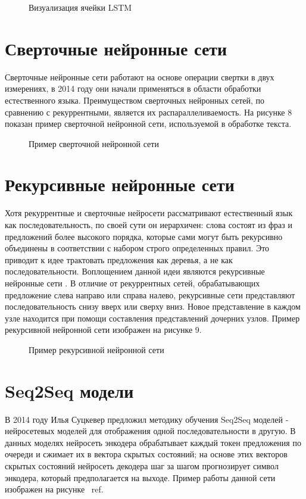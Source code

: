 \begin{figure}[ht]
  \caption{Визуализация ячейки LSTM}\label{fig:Neuro3-LSTM}
\end{figure}


\section{Сверточные нейронные сети}
Сверточные нейронные сети работают на основе операции свертки в двух измерениях, в 2014 году \cite{kalchbrenner_2014} они начали применяться в области обработки естественного языка. Преимуществом сверточных нейронных сетей, по сравнению с рекуррентными, является их распараллеливаемость. На рисунке 8 показан пример сверточной нейронной сети, используемой в обработке текста.


\begin{figure}[ht]
  \caption{Пример сверточной нейронной сети}\label{fig:Neuro4-CNN}
\end{figure}

\section{Рекурсивные нейронные сети}
Хотя рекуррентные и сверточные нейросети рассматривают естественный язык как последовательность, по своей сути он иерархичен: слова состоят из фраз и предложений более высокого порядка, которые сами могут быть рекурсивно объединены в соответствии с набором строго определенных правил. Это приводит к идее трактовать предложения как деревья, а не как последовательности. Воплощением данной идеи являются рекурсивные нейронные сети \cite{socher_2013}. В отличие от рекуррентных сетей, обрабатывающих предложение слева направо или справа налево, рекурсивные сети представляют последовательность снизу вверх или сверху вниз. Новое представление в каждом узле находится при помощи составления представлений дочерних узлов. Пример рекурсивной нейронной сети изображен на рисунке 9.



\begin{figure}[ht]
  \caption{Пример рекурсивной нейронной сети}\label{fig:Neuro5-RNN}
\end{figure}

\section{Seq2Seq  модели}
     В 2014 году Илья Суцкевер предложил методику обучения Seq2Seq моделей \cite{sutskever_2014} - нейросетевых моделей для отображения одной последовательности в другую. В данных моделях нейросеть энкодера обрабатывает каждый токен предложения по очереди  и сжимает их в вектора скрытых состояний; на основе этих векторов скрытых состояний нейросеть декодера шаг за шагом прогнозирует символ энкодера, который предполагается на выходе. Пример работы данной сети изображен на рисунке ~ref.

